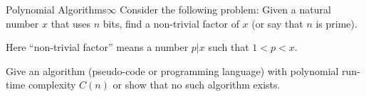 \documentclass[a4paper]{article}
\begin{document}
\begin{problem}{Polynomial Algorithms}{$\infty$}
Consider the following problem: Given a natural number $x$ that uses $n$ bits, find a non-trivial factor of $x$ (or say that $n$ is prime).

Here ``non-trivial factor'' means a number $p|x$ such that $1<p<x$.

Give an algorithm (pseudo-code or programming language) with polynomial run-time complexity $C(n)$ or show that no such algorithm exists.
\end{problem}
\end{document}
